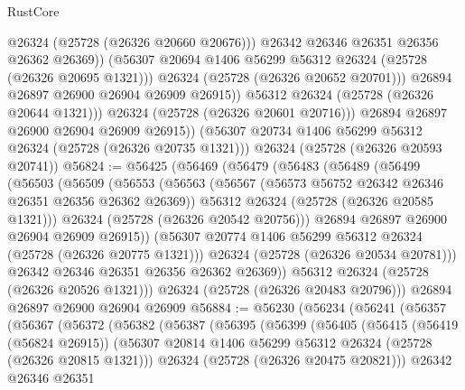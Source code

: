 \begin{lexlean}{RustCore}
\begin{coremodule}
                        @26324
                        (@25728 (@26326 @20660 @20676)))
                      @26342
                      @26346
                      @26351
                      @26356
                      @26362
                      @26369))
                  (@56307 @20694 @1406 @56299 @56312 @26324 (@25728 (@26326 @20695 @1321)))
                  @26324
                  (@25728 (@26326 @20652 @20701)))
                @26894
                @26897
                @26900
                @26904
                @26909
                @26915))
            @56312
            @26324
            (@25728 (@26326 @20644 @1321)))
          @26324
          (@25728 (@26326 @20601 @20716)))
        @26894
        @26897
        @26900
        @26904
        @26909
        @26915))
    (@56307 @20734 @1406 @56299 @56312 @26324 (@25728 (@26326 @20735 @1321)))
    @26324
    (@25728 (@26326 @20593 @20741))
@56824 := @56425
    (@56469
      (@56479
        (@56483
          (@56489
            (@56499
              (@56503
                (@56509
                  (@56553
                    (@56563
                      (@56567 (@56573 @56752 @26342 @26346 @26351 @26356 @26362 @26369))
                      @56312
                      @26324
                      (@25728 (@26326 @20585 @1321)))
                    @26324
                    (@25728 (@26326 @20542 @20756)))
                  @26894
                  @26897
                  @26900
                  @26904
                  @26909
                  @26915))
              (@56307 @20774 @1406 @56299 @56312 @26324 (@25728 (@26326 @20775 @1321)))
              @26324
              (@25728 (@26326 @20534 @20781)))
            @26342
            @26346
            @26351
            @26356
            @26362
            @26369))
        @56312
        @26324
        (@25728 (@26326 @20526 @1321)))
      @26324
      (@25728 (@26326 @20483 @20796)))
    @26894
    @26897
    @26900
    @26904
    @26909
@56884 := @56230
    (@56234
      (@56241
        (@56357
          (@56367
            (@56372
              (@56382
                (@56387
                  (@56395
                    (@56399
                      (@56405
                        (@56415
                          (@56419 (@56824 @26915))
                          (@56307 @20814 @1406 @56299 @56312 @26324 (@25728 (@26326 @20815 @1321)))
                          @26324
                          (@25728 (@26326 @20475 @20821)))
                        @26342
                        @26346
                        @26351

\end{coremodule}
\end{lexlean}
